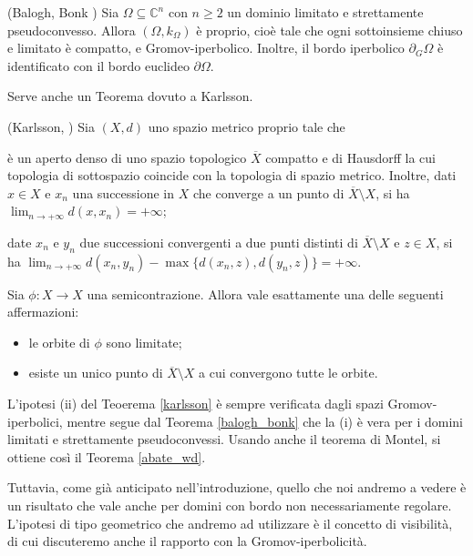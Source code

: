 \begin{thm} \label{balogh_bonk}
    (Balogh, Bonk \cite[Theorem 1.4]{BB}) Sia $\Omega \subseteq \mathbb{C}^n$ con $n \ge 2$ un dominio limitato e strettamente pseudoconvesso. Allora $(\Omega,k_{\Omega})$ è proprio, cioè tale che ogni sottoinsieme chiuso e limitato è compatto, e Gromov-iperbolico. Inoltre, il bordo iperbolico $\partial_G\Omega$ è identificato con il bordo euclideo $\partial\Omega$.
\end{thm}

Serve anche un Teorema dovuto a Karlsson.

\begin{thm} \label{karlsson}
    (Karlsson, \cite[Corollary 3.7]{Ka}) Sia $(X,d)$ uno spazio metrico proprio tale che
    \begin{nlist}
        \item è un aperto denso di uno spazio topologico $\overline{X}$ compatto e di Hausdorff la cui topologia di sottospazio coincide con la topologia di spazio metrico. Inoltre, dati $x \in X$ e $x_n$ una successione in $X$ che converge a un punto di $\overline{X}\setminus X$, si ha $\displaystyle\lim_{n\longrightarrow+\infty}d(x,x_n)=+\infty$;
        \item date $x_n$ e $y_n$ due successioni convergenti a due punti distinti di $\overline{X}\setminus X$ e $z \in X$, si ha $\displaystyle\lim_{n\longrightarrow+\infty} d(x_n,y_n)-\max\{d(x_n,z),d(y_n,z)\}=+\infty$.
    \end{nlist}
    Sia $\phi:X \longrightarrow X$ una semicontrazione. Allora vale esattamente una delle seguenti affermazioni:
    \begin{itemize}
        \item le orbite di $\phi$ sono limitate;
        \item esiste un unico punto di $\overline{X}\setminus X$ a cui convergono tutte le orbite.
    \end{itemize}
\end{thm}

L'ipotesi (ii) del Teoerema \ref{karlsson} è sempre verificata dagli spazi Gromov-iperbolici, mentre segue dal Teorema \ref{balogh_bonk} che la (i) è vera per i domini limitati e strettamente pseudoconvessi. Usando anche il teorema di Montel, si ottiene così il Teorema \ref{abate_wd}.

Tuttavia, come già anticipato nell'introduzione, quello che noi andremo a vedere è un risultato che vale anche per domini con bordo non necessariamente regolare. L'ipotesi di tipo geometrico che andremo ad utilizzare è il concetto di visibilità, di cui discuteremo anche il rapporto con la Gromov-iperbolicità.